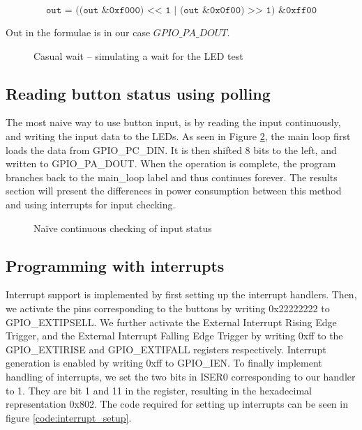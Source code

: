 $$ \texttt{out = ((out \& 0xf000) << 1 | (out \& 0x0f00) >> 1) \& 0xff00} $$

Out in the formulae is in our case $GPIO\_PA\_DOUT$.


\begin{figure}[h!]
\caption{Casual wait – simulating a wait for the LED test}
\label{code:casual_wait}
\end{figure}

\subsection{Reading button status using polling}
\label{subsec:polling}

The most naive way to use button input, is by reading the input continuously, and writing the input data to the LEDs.
As seen in Figure \ref{code:polling}, the main loop first loads the data from GPIO\_PC\_DIN.
It is then shifted 8 bits to the left, and written to GPIO\_PA\_DOUT.
When the operation is complete, the program branches back to the main\_loop label and thus continues forever.
The results section will present the differences in power consumption between this method and using interrupts for input checking.

\begin{figure}[h!]
\caption{Naïve continuous checking of input status}
\label{code:polling}
\end{figure}

\subsection{Programming with interrupts}
\label{subsec:dev_pros_interrupts}

Interrupt support is implemented by first setting up the interrupt handlers.
Then, we activate the pins corresponding to the buttons by writing 0x22222222 to GPIO\_EXTIPSELL.
We further activate the External Interrupt Rising Edge Trigger, and the External Interrupt Falling Edge Trigger by writing 0xff to the GPIO\_EXTIRISE and GPIO\_EXTIFALL registers respectively.
Interrupt generation is enabled by writing 0xff to GPIO\_IEN.
To finally implement handling of interrupts, we set the two bits in ISER0 corresponding to our handler to 1. They are bit 1 and 11 in the register, resulting in the hexadecimal representation 0x802.
The code required for setting up interrupts can be seen in figure \ref{code:interrupt_setup}.

